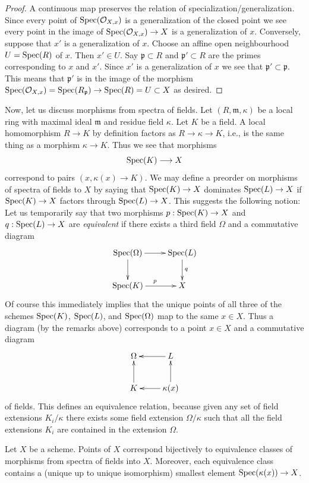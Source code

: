 \begin{proof}
A continuous map preserves the relation of specialization/generalization.
Since every point of $\mathop{\mathrm{Spec}}(\mathcal{O}_{X, x})$ is a
generalization of the closed point we see every point in the image
of $\mathop{\mathrm{Spec}}(\mathcal{O}_{X, x}) \to X$ is a generalization of $x$.
Conversely, suppose that $x'$ is a generalization of $x$.
Choose an affine open neighbourhood $U = \mathop{\mathrm{Spec}}(R)$ of
$x$. Then $x' \in U$. Say $\mathfrak p \subset R$ and
$\mathfrak p' \subset R$ are the primes corresponding
to $x$ and $x'$. Since $x'$ is a generalization of $x$
we see that $\mathfrak p' \subset \mathfrak p$. This means
that $\mathfrak p'$ is in the image of the morphism
$\mathop{\mathrm{Spec}}(\mathcal{O}_{X, x}) = \mathop{\mathrm{Spec}}(R_{\mathfrak p})
\to \mathop{\mathrm{Spec}}(R) = U \subset X$ as desired.
\end{proof}

\noindent
Now, let us discuss morphisms from spectra of fields.
Let $(R, \mathfrak m, \kappa)$ be a local ring
with maximal ideal $\mathfrak m$ and residue field $\kappa$.
Let $K$ be a field. A local homomorphism $R \to K$ by definition
factors as $R \to \kappa \to K$, i.e., is the same thing as
a morphism $\kappa \to K$. Thus we see that morphisms
$$
\mathop{\mathrm{Spec}}(K) \longrightarrow X
$$
correspond to pairs $(x, \kappa(x) \to K)$. We may define
a preorder on morphisms of spectra of fields to $X$
by saying that $\mathop{\mathrm{Spec}}(K) \to X$ dominates
$\mathop{\mathrm{Spec}}(L) \to X$ if $\mathop{\mathrm{Spec}}(K) \to X$
factors through $\mathop{\mathrm{Spec}}(L) \to X$. This suggests
the following notion: Let us temporarily
say that two morphisms $p : \mathop{\mathrm{Spec}}(K) \to X$ and
$q : \mathop{\mathrm{Spec}}(L) \to X$ are {\it equivalent} if there exists
a third field $\Omega$ and a commutative diagram
$$
\xymatrix{
\Spec(\Omega) \ar[r] \ar[d] &
\Spec(L) \ar[d]^q \\
\Spec(K) \ar[r]^p &
X
}
$$
Of course this immediately implies that the unique points of
all three of the schemes $\mathop{\mathrm{Spec}}(K)$,
$\mathop{\mathrm{Spec}}(L)$, and $\mathop{\mathrm{Spec}}(\Omega)$
map to the same $x \in X$. Thus a diagram (by the remarks above)
corresponds to a point $x \in X$ and a commutative diagram
$$
\xymatrix{
\Omega &
L \ar[l] \\
K \ar[u] &
\kappa(x) \ar[l] \ar[u]
}
$$
of fields. This defines an equivalence relation, because given
any set of field extensions $K_i/\kappa$ there exists
some field extension $\Omega/\kappa$ such that all
the field extensions $K_i$ are contained in the extension $\Omega$.

\begin{lemma}
\label{lemma-characterize-points}
Let $X$ be a scheme. Points of $X$ correspond bijectively
to equivalence classes of morphisms from spectra of
fields into $X$. Moreover, each equivalence class contains
a (unique up to unique isomorphism) smallest element
$\mathop{\mathrm{Spec}}(\kappa(x)) \to X$.
\end{lemma}

